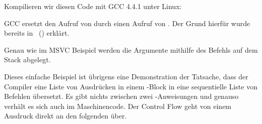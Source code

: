 
Kompilieren wir diesen Code mit GCC 4.4.1 unter Linux:



GCC ersetzt den Aufruf von \printf durch einen Aufruf von \puts. Der Grund hierfür wurde bereits in ~() erklärt.

% 
Genau wie im MSVC Beispiel werden die Argumente mithilfe des Befehls \MOV auf dem Stack abgelegt.

Dieses einfache Beispiel ist übrigens eine Demonstration der Tatsache, dass der Compiler eine Liste von Ausdrücken in einem
\CCpp-Block in eine sequentielle Liste von Befehlen übersetzt.
Es gibt nichts zwischen zwei \CCpp-Anweisungen und genauso verhält es sich auch im Maschinencode.
Der Control Flow geht von einem Ausdruck direkt an den folgenden über.